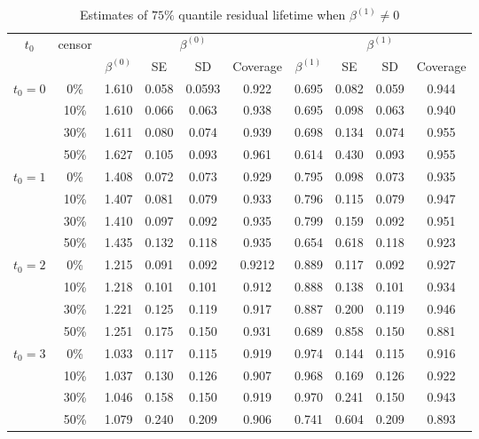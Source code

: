 \documentclass[12pt]{article}
\begin{document}
	\begin{table}[H]
		\caption{Estimates of $75\%$ quantile residual lifetime when $\beta^{(1)} \neq 0$}
		\centering
		\begin{tabular}{|c|c|c|c|c|c|c|c|c|c|}
			\hline
			\multirow{2}{*}{$t_0$} & \multirow{2}{*}{censor} & \multicolumn{4}{c|}{$\beta^{(0)}$} & \multicolumn{4}{c|}{$\beta^{(1)}$}\\ \cline{3-10}
			& & $\beta^{(0)}$ & SE & SD  & Coverage  & $\beta^{(1)}$ & SE & SD & Coverage\\
			\hline\hline
			\multirow{4}{*}{$t_0=0$} & 0\% & 1.610 & 0.058 & 0.0593 & 0.922 & 0.695 & 0.082 & 0.059 & 0.944 \\
			& 10\% & 1.610 & 0.066 & 0.063 & 0.938 & 0.695 & 0.098 & 0.063 & 0.940 \\
			& 30\% & 1.611 & 0.080 & 0.074 & 0.939 & 0.698 & 0.134 & 0.074 & 0.955 \\
			& 50\% & 1.627 & 0.105 & 0.093 & 0.961 & 0.614 & 0.430 & 0.093 & 0.955 \\
			\hline
			\multirow{4}{*}{$t_0=1$} & 0\% & 1.408 & 0.072 & 0.073 & 0.929 & 0.795 & 0.098 & 0.073 & 0.935 \\
			& 10\% & 1.407 & 0.081 & 0.079 & 0.933 & 0.796 & 0.115 & 0.079 & 0.947 \\
			& 30\% & 1.410 & 0.097 & 0.092 & 0.935 & 0.799 & 0.159 & 0.092 & 0.951 \\
			& 50\% & 1.435 & 0.132 & 0.118 & 0.935 & 0.654 & 0.618 & 0.118 & 0.923 \\
			\hline
			\multirow{4}{*}{$t_0=2$} & 0\% & 1.215 & 0.091 & 0.092 & 0.9212 & 0.889 & 0.117 & 0.092 & 0.927 \\
			& 10\% & 1.218 & 0.101 & 0.101 & 0.912 & 0.888 & 0.138 & 0.101 & 0.934 \\
			& 30\% & 1.221 & 0.125 & 0.119 & 0.917 & 0.887 & 0.200 & 0.119 & 0.946 \\
			& 50\% & 1.251 & 0.175 & 0.150 & 0.931 & 0.689 & 0.858 & 0.150 & 0.881 \\
			\hline
			\multirow{4}{*}{$t_0=3$} & 0\% & 1.033 & 0.117 & 0.115 & 0.919 & 0.974 & 0.144 & 0.115 & 0.916 \\
			& 10\% & 1.037 & 0.130 & 0.126 & 0.907 & 0.968 & 0.169 & 0.126 & 0.922 \\
			& 30\% & 1.046 & 0.158 & 0.150 & 0.919 & 0.970 & 0.241 & 0.150 & 0.943 \\
			& 50\% & 1.079 & 0.240 & 0.209 & 0.906 & 0.741 & 0.604 & 0.209 & 0.893 \\	
			\hline
		\end{tabular}
	\end{table}
\end{document}
